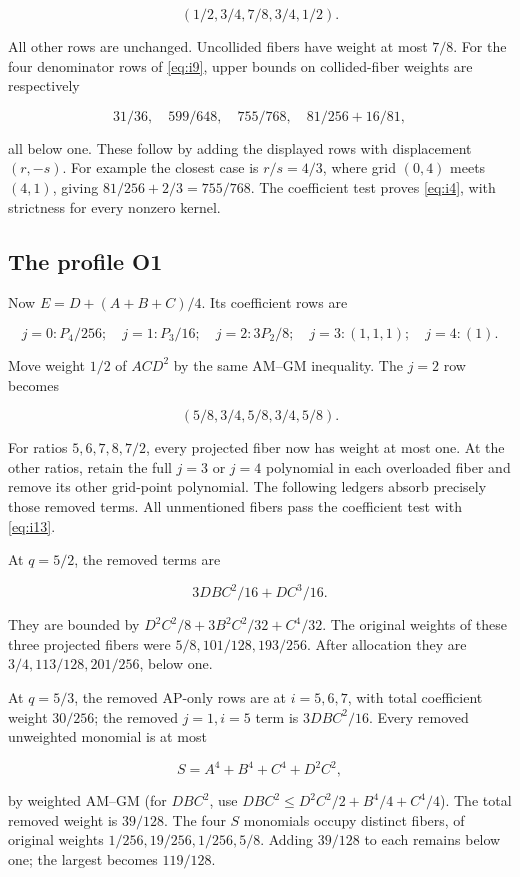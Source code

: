 \[
(1/2,3/4,7/8,3/4,1/2).
\]

All other rows are unchanged. Uncollided fibers have weight at most \(7/8\).
For the four denominator rows of \eqref{eq:i9}, upper bounds on collided-fiber weights
are respectively

\[
31/36,\quad 599/648,\quad755/768,\quad81/256+16/81,
\]

all below one. These follow by adding the displayed rows with displacement
\((r,-s)\). For example the closest case is \(r/s=4/3\), where grid
\((0,4)\) meets \((4,1)\), giving \(81/256+2/3=755/768\).
The coefficient test proves \eqref{eq:i4}, with strictness for every nonzero kernel.

\subsection{The profile O1}\label{sec:i-o1}

Now \(E=D+(A+B+C)/4\). Its coefficient rows are

\[
j=0:P_4/256;\quad j=1:P_3/16;\quad j=2:3P_2/8;
\quad j=3:(1,1,1);\quad j=4:(1).
\]

Move weight \(1/2\) of \(ACD^2\) by the same AM--GM inequality. The \(j=2\)
row becomes

\begin{equation}\label{eq:i13}
(5/8,3/4,5/8,3/4,5/8).
\end{equation}

For ratios \(5,6,7,8,7/2\), every projected fiber now has weight at most
one. At the other ratios, retain the full \(j=3\) or \(j=4\) polynomial
in each overloaded fiber and remove its other grid-point polynomial. The
following ledgers absorb precisely those removed terms. All unmentioned
fibers pass the coefficient test with \eqref{eq:i13}.

At \(q=5/2\), the removed terms are

\[
3DBC^2/16+DC^3/16.
\]

They are bounded by \(D^2C^2/8+3B^2C^2/32+C^4/32\). The original
weights of these three projected fibers were \(5/8,101/128,193/256\).
After allocation they are \(3/4,113/128,201/256\), below one.

At \(q=5/3\), the removed AP-only rows are at \(i=5,6,7\), with total
coefficient weight \(30/256\); the removed \(j=1,i=5\) term is
\(3DBC^2/16\). Every removed unweighted monomial is at most

\[
S=A^4+B^4+C^4+D^2C^2,
\]

by weighted AM--GM (for \(DBC^2\), use
\(DBC^2\le D^2C^2/2+B^4/4+C^4/4\)). The total removed weight is
\(39/128\). The four \(S\) monomials occupy distinct fibers, of original
weights \(1/256,19/256,1/256,5/8\). Adding \(39/128\) to each remains
below one; the largest becomes \(119/128\).

